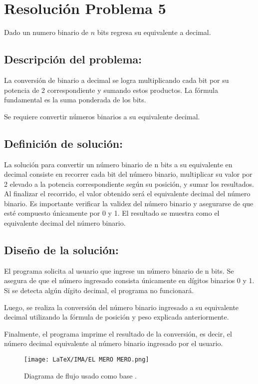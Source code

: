 \section{Resolución Problema 5}
Dado un numero binario de $n$ bits regresa su equivalente a decimal.


\subsection{\textbf{Descripción del problema:}}

La conversión de binario a decimal se logra multiplicando cada bit por su potencia de 2 correspondiente y sumando estos productos. La fórmula fundamental es la suma ponderada de los bits.


Se requiere convertir números binarios a su equivalente decimal.

\subsection{\textbf{Definición de solución:}}
La solución para convertir un número binario de n bits a su equivalente en decimal consiste en recorrer cada bit del número binario, multiplicar su valor por 2 elevado a la potencia correspondiente según su posición, y sumar los resultados. Al finalizar el recorrido, el valor obtenido será el equivalente decimal del número binario. Es importante verificar la validez del número binario y asegurarse de que esté compuesto únicamente por 0 y 1. El resultado se muestra como el equivalente decimal del número binario.


\subsection{\textbf{Diseño de la solución:}}
El programa solicita al usuario que ingrese un número binario de n bits. Se asegura de que el número ingresado consista únicamente en dígitos binarios 0 y 1. Si se detecta algún dígito decimal, el programa no funcionará.

Luego, se realiza la conversión del número binario ingresado a su equivalente decimal utilizando la fórmula de posición y peso explicada anteriormente.

Finalmente, el programa imprime el resultado de la conversión, es decir, el número decimal equivalente al número binario ingresado por el usuario.


\begin{figure}[H]
    \centering
    \texttt{[image: LaTeX/IMA/EL MERO MERO.png]}
    \caption{Diagrama de flujo usado como base .}
\end{figure}


